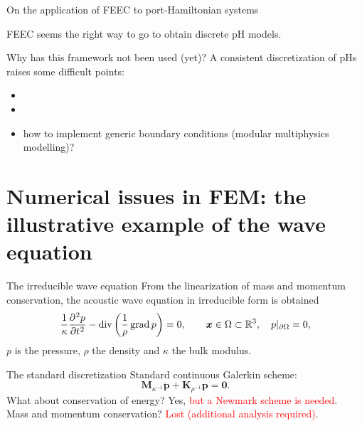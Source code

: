 \documentclass[aspectratio=169]{beamer}
\DeclareMathOperator*{\grad}{grad}
\renewcommand{\div}{\operatorname{div}}
\newcommand{\bbR}{\mathbb{R}}
\begin{document}
\begin{frame}{On the application of FEEC to port-Hamiltonian systems}

FEEC seems the right way to go to obtain discrete pH models. \\

\begin{alertblock}{Why has this framework not been used (yet)?}
A consistent discretization of pHs raises some difficult points:
\begin{itemize}
	\item {} \only<5->{\textcolor{blue}{how to exactly enforce discrete conservation laws?}}
	\item {}
	\item<4-> how to implement generic boundary conditions (modular multiphysics modelling)?
\end{itemize}
\end{alertblock}

\end{frame}

\section{Numerical issues in FEM: the illustrative example of the wave equation}


\begin{frame}{The irreducible wave equation}
From the linearization of mass and momentum conservation, the acoustic wave equation in irreducible form is obtained
\begin{equation*}
\frac{1}{\kappa} \diffp[2]{p}{t} - \div\left(\frac{1}{\rho}\grad p\right) = 0,  \qquad \bm{x} \in \Omega \subset \bbR^3, \quad p|_{\partial\Omega} =0,
\end{equation*}
$p$ is the pressure, $\rho$ the density and $\kappa$ the bulk modulus.


\begin{block}{The standard discretization}
	Standard continuous Galerkin scheme:
	\begin{equation*}
		\mathbf{M}_{\kappa^{-1}} \ddot{\mathbf{p}} + \mathbf{K}_{\rho^{-1}} \mathbf{p} = \mathbf{0}.
	\end{equation*}
	What about conservation of energy? Yes, \textcolor{red}{but a Newmark scheme is needed}.\\
	Mass and momentum conservation? \textcolor{red}{Lost (additional analysis required)}.
\end{block}

\end{frame}
\end{document}
